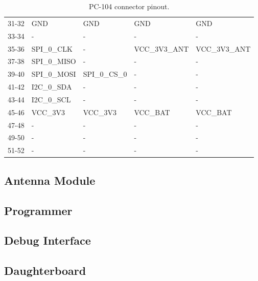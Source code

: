 \begin{table}[!h]
\begin{tabular}{cllll}
        31-32              & GND              & GND              & GND           & GND           \\
        33-34              & -                & -                & -             & -             \\
        35-36              & SPI\_0\_CLK      & -                & VCC\_3V3\_ANT & VCC\_3V3\_ANT \\
        37-38              & SPI\_0\_MISO     & -                & -             & -             \\
        39-40              & SPI\_0\_MOSI     & SPI\_0\_CS\_0    & -             & -             \\
        41-42              & I2C\_0\_SDA      & -                & -             & -             \\
        43-44              & I2C\_0\_SCL      & -                & -             & -             \\
        45-46              & VCC\_3V3         & VCC\_3V3         & VCC\_BAT      & VCC\_BAT      \\
        47-48              & -                & -                & -             & -             \\
        49-50              & -                & -                & -             & -             \\
        51-52              & -                & -                & -             & -             \\
        \bottomrule[1.5pt]
    \end{tabular}
    \caption{PC-104 connector pinout.}
    \label{tab:pc104-pins}
\end{table}

\subsection{Antenna Module}



\subsection{Programmer}



\subsection{Debug Interface}



\subsection{Daughterboard}

